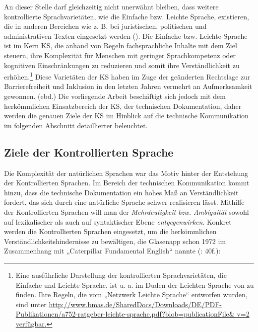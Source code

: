 An dieser Stelle darf gleichzeitig nicht unerwähnt bleiben, dass weitere kontrollierte Sprachvarietäten, wie die Einfache bzw. Leichte Sprache, existieren, die in anderen Bereichen wie z. B. bei juristischen, politischen und administrativen Texten eingesetzt werden (\citealt{Hansen-SchirraGutermuth2018}). Die Einfache bzw. Leichte Sprache ist im Kern KS, die anhand von Regeln fachsprachliche Inhalte mit dem Ziel steuern, ihre Komplexität für Menschen mit geringer Sprachkompetenz oder kognitiven Einschränkungen zu reduzieren und somit ihre Verständlichkeit zu erhöhen.\footnote{Eine ausführliche Darstellung der kontrollierten Sprachvarietäten, die Einfache und Leichte Sprache, ist u. a. im Duden der Leichten Sprache von \citet{BredelMaaß2016} zu finden. Ihre Regeln, die vom „Netzwerk Leichte Sprache“ entworfen wurden, sind unter \url{http://www.bmas.de/SharedDocs/Downloads/DE/PDF-Publikationen/a752-ratgeber-leichte-sprache.pdf?blob=publicationFile\& v=2   verfügbar.}}  Diese Varietäten der KS haben im Zuge der geänderten Rechtslage zur Barrierefreiheit und Inklusion in den letzten Jahren vermehrt an Aufmerksamkeit gewonnen. (ebd.) Die vorliegende Arbeit beschäftigt sich jedoch mit dem herkömmlichen Einsatzbereich der KS, der technischen Dokumentation, daher werden die genauen Ziele der KS im Hinblick auf die technische Kommunikation im folgenden Abschnitt detaillierter beleuchtet.

\subsection{Ziele der Kontrollierten Sprache}
\label{sec:2.1.2}
Die Komplexität der natürlichen Sprachen war das Motiv hinter der Entstehung der Kontrollierten Sprachen. Im Bereich der technischen Kommunikation kommt hinzu, dass die technische Dokumentation ein hohes Maß an Verständlichkeit fordert, das sich durch eine natürliche Sprache schwer realisieren lässt. Mithilfe der Kontrollierten Sprachen will man der \textit{Mehrdeutigkeit bzw. Ambiguität} sowohl auf lexikalischer als auch auf syntaktischer Ebene \textit{entgegenwirken}. Konkret werden die Kontrollierten Sprachen eingesetzt, um die herkömmlichen Verständlichkeitshindernisse zu bewältigen, die Glasenapp schon 1972 im Zusammenhang mit „Caterpillar Fundamental English“ nannte (\citealt{Lehrndorfer1996a}: 40f.):


